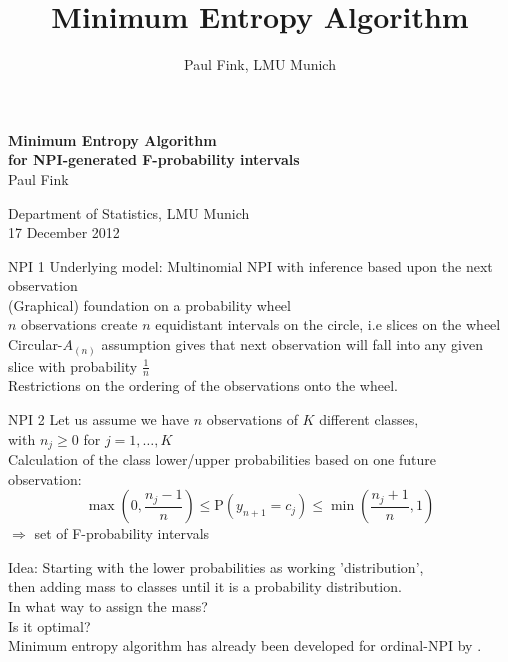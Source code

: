 \documentclass{beamer}
\theoremstyle{definition} \newtheorem{llemma}{Lemma}
\newcommand{\Pb}{\mathrm{P}}
\begin{document}
\title{Minimum Entropy Algorithm}
\author{Paul Fink, LMU Munich}

\begin{frame}
\begin{center}
\textbf{\Large{Minimum Entropy Algorithm}}\\[0.25em]
\textbf{\large{for NPI-generated F-probability intervals}}\\[1.5em]
\large{Paul Fink}\\
\begin{normalsize}
Department of Statistics, LMU Munich\\[1.5em]
17 December 2012\\
\end{normalsize}
\end{center}
\end{frame}

\begin{frame}{NPI 1}
Underlying model: Multinomial NPI with inference based upon the next observation\\[0.6em]
(Graphical) foundation on a probability wheel\\[0.6em]
$n$ observations create $n$ equidistant intervals on the circle, i.e slices on the wheel\\[0.6em]
Circular-$A_{(n)}$ assumption gives that next observation will fall into any given slice with probability $\frac{1}{n}$\\[0.6em]
Restrictions on the ordering of the observations onto the wheel.
\end{frame}

\begin{frame}{NPI 2}
Let us assume we have $n$ observations of $K$ different classes,\\
with $n_j \geq 0$ for $j = 1, \ldots, K$\\[0.6em]
Calculation of the class lower/upper probabilities based on one future observation:
\begin{displaymath}
\max(0, \frac{n_j-1}{n}) \leq \Pb(y_{n+1} = c_j) \leq \min(\frac{n_j+1}{n}, 1)
\end{displaymath}
$\Longrightarrow$ set of F-probability intervals
\end{frame}

\begin{frame}
Idea: Starting with the lower probabilities as working 'distribution',\\
then adding mass to classes until it is a probability distribution.\\[0.6em]
In what way to assign the mass?\\[0.8em]
Is it optimal?\\[1.4em]


Minimum entropy algorithm has already been developed for ordinal-NPI by \cite{minEntAlg}.
\end{frame}
\end{document}
